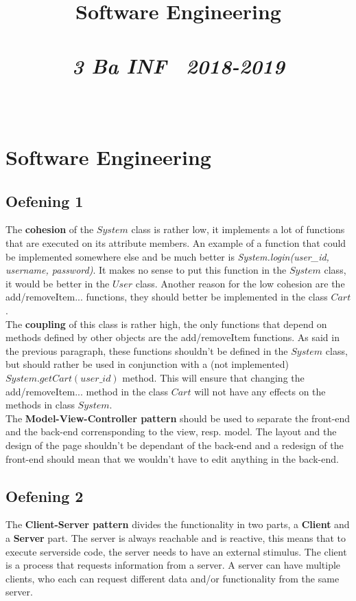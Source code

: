 \documentclass{article}
\title{\textmd{\textbf{Software Engineering}}\\\normalsize\vspace{0.1in}\Large{\assignmentname}\\\vspace{0.1in}\small{\textit{3 Ba INF \  2018-2019}}}
\author{\studentA \\ \studentB}
\begin{document}
\maketitle

\section{Software Engineering}

\subsection{Oefening 1}
The \textbf{cohesion} of the $System$ class is rather low, it implements a lot of functions that are executed on its attribute members. An example of a function that could be implemented somewhere else and be much better is \textit{System.login(user\_id, username, password)}. It makes no sense to put this function in the $System$ class, it would be better in the $User$ class. Another reason for the low cohesion are the add/removeItem... functions, they should better be implemented in the class $Cart$. \\

The \textbf{coupling} of this class is rather high, the only functions that depend on methods defined by other objects are the add/removeItem functions. As said in the previous paragraph, these functions shouldn't be defined in the $System$ class, but should rather be used in conjunction with a (not implemented) $System.getCart(user\_id)$ method. This will ensure that changing the add/removeItem... method in the class $Cart$ will not have any effects on the methods in class $System$. \\

The \textbf{Model-View-Controller pattern} should be used to separate the front-end and the back-end corrensponding to the view, resp. model. The layout and the design of the page shouldn't be dependant of the back-end and a redesign of the front-end should mean that we wouldn't have to edit anything in the back-end. \\

\subsection{Oefening 2}

The \textbf{Client-Server pattern} divides the functionality in two parts, a \textbf{Client} and a \textbf{Server} part. The server is always reachable and is reactive, this means that to execute serverside code, the server needs to have an external stimulus. The client is a process that requests information from a server. A server can have multiple clients, who each can request different data and/or functionality from the same server. \\
\end{document}
